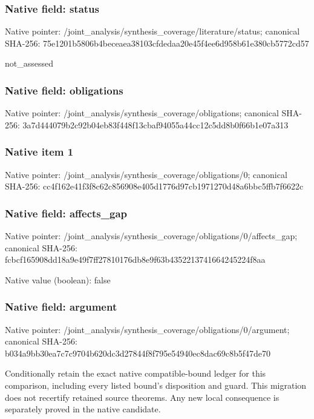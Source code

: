 \documentclass[10pt,a4paper]{article}
\begin{document}
\subsubsection{Native field: status}
Native pointer: /joint\_\allowbreak{}analysis/synthesis\_\allowbreak{}coverage/literature/status; canonical SHA-256: 75e1201b5806b4beceaea38103cfdedaa20e45f4ee6d958b61e380cb5772cd57

\begingroup\raggedright\sloppy not\_\allowbreak{}assessed\par\endgroup

\subsubsection{Native field: obligations}
Native pointer: /joint\_\allowbreak{}analysis/synthesis\_\allowbreak{}coverage/obligations; canonical SHA-256: 3a7d444079b2c92b04eb83f448f13cbaf94055a44cc12c5dd8b0f66b1e07a313

\subsubsection{Native item 1}
Native pointer: /joint\_\allowbreak{}analysis/synthesis\_\allowbreak{}coverage/obligations/0; canonical SHA-256: cc4f162e41f3f8c62c856908e405d1776d97cb1971270d48a6bbc5ffb7f6622c

\subsubsection{Native field: affects\_\allowbreak{}gap}
Native pointer: /joint\_\allowbreak{}analysis/synthesis\_\allowbreak{}coverage/obligations/0/affects\_\allowbreak{}gap; canonical SHA-256: fcbcf165908dd18a9e49f7ff27810176db8e9f63b4352213741664245224f8aa

Native value (boolean): false

\subsubsection{Native field: argument}
Native pointer: /joint\_\allowbreak{}analysis/synthesis\_\allowbreak{}coverage/obligations/0/argument; canonical SHA-256: b034a9bb30ea7c7c9704b620dc3d27844f8f795e54940ec8dac69c8b5f47de70

\begingroup\raggedright\sloppy Conditionally retain the exact native compatible-bound ledger for this comparison,\allowbreak{} including every listed bound's disposition and guard. This migration does not recertify retained source theorems. Any new local consequence is separately proved in the native candidate.\par\endgroup
\end{document}
